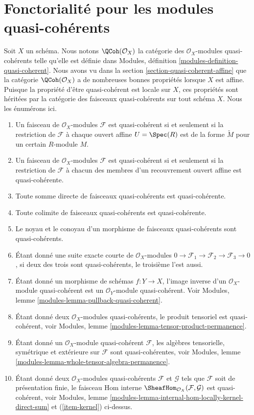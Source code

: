 \section{Fonctorialité pour les modules quasi-cohérents}
\label{section-quasi-coherent}

\noindent
Soit $X$ un schéma. Nous notons $\QCoh(\mathcal{O}_X)$ la
catégorie des $\mathcal{O}_X$-modules quasi-cohérents telle qu'elle est définie dans
Modules, définition \ref{modules-definition-quasi-coherent}. Nous
avons vu dans
la section \ref{section-quasi-coherent-affine}
que la catégorie $\QCoh(\mathcal{O}_X)$ a de nombreuses bonnes propriétés
lorsque $X$ est affine. Puisque la propriété d'être quasi-cohérent est
locale sur $X$, ces propriétés sont héritées par la catégorie des
faisceaux quasi-cohérents sur tout schéma $X$. Nous les énumérons ici.
\begin{enumerate}
\item Un faisceau de $\mathcal{O}_X$-modules $\mathcal{F}$ est
quasi-cohérent si et seulement si la restriction de $\mathcal{F}$ à
chaque ouvert affine $U = \Spec(R)$ est de la forme
$\widetilde M$ pour un certain $R$-module $M$.
\item Un faisceau de $\mathcal{O}_X$-modules $\mathcal{F}$ est
quasi-cohérent si et seulement si la restriction de $\mathcal{F}$ à
chacun des membres d'un recouvrement ouvert affine est quasi-cohérente. \item
Toute somme directe de faisceaux quasi-cohérents est quasi-cohérente.
\item Toute colimite de faisceaux quasi-cohérents est quasi-cohérente.
\item
\label{item-kernel}
Le noyau et le conoyau d'un morphisme de faisceaux quasi-cohérents sont
quasi-cohérents.
\item Étant donné une suite exacte courte de $\mathcal{O}_X$-modules
$0 \to \mathcal{F}_1 \to \mathcal{F}_2 \to \mathcal{F}_3 \to 0$, si
deux des trois sont quasi-cohérents, le troisième l'est aussi.
\item Étant donné un morphisme de schémas $f : Y \to X$, l'image
inverse d'un $\mathcal{O}_X$-module quasi-cohérent est un
$\mathcal{O}_Y$-module quasi-cohérent.
Voir Modules, lemme \ref{modules-lemma-pullback-quasi-coherent}.
\item Étant donné deux $\mathcal{O}_X$-modules quasi-cohérents,
le produit tensoriel est quasi-cohérent,
voir Modules, lemme \ref{modules-lemma-tensor-product-permanence}.
\item Étant donné un $\mathcal{O}_X$-module quasi-cohérent $\mathcal{F}$,
les algèbres tensorielle, symétrique et extérieure sur $\mathcal{F}$
sont quasi-cohérentes,
voir Modules, lemme \ref{modules-lemma-whole-tensor-algebra-permanence}.
\item Étant donné deux $\mathcal{O}_X$-modules quasi-cohérents
$\mathcal{F}$ et $\mathcal{G}$ tels que $\mathcal{F}$
soit de présentation finie, le faisceau Hom
interne $\SheafHom_{\mathcal{O}_X}(\mathcal{F}, \mathcal{G})$
est quasi-cohérent,
voir Modules, lemme \ref{modules-lemma-internal-hom-locally-kernel-direct-sum}
et (\ref{item-kernel}) ci-dessus.
\end{enumerate}
